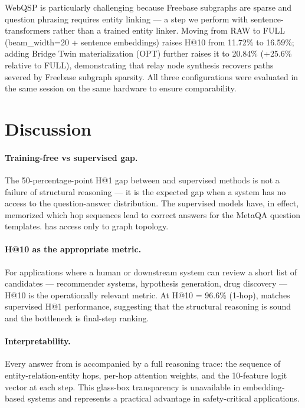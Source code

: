 \documentclass[10pt,twocolumn]{article}
\begin{document}
WebQSP is particularly challenging because Freebase subgraphs are sparse and
question phrasing requires entity linking — a step we perform with sentence-transformers
rather than a trained entity linker. Moving from RAW to FULL (beam\_width=20 +
sentence embeddings) raises H@10 from 11.72\% to 16.59\%; adding Bridge Twin
materialization (OPT) further raises it to 20.84\% (+25.6\% relative to FULL),
demonstrating that relay node synthesis recovers paths severed by Freebase subgraph
sparsity. All three configurations were evaluated in the same session on the same
hardware to ensure comparability.

\section{Discussion}
\label{sec:discussion}

\paragraph{Training-free vs supervised gap.}
The 50-percentage-point H@1 gap between \CEREBRUM{} and supervised methods is not a
failure of structural reasoning — it is the expected gap when a system has no access to
the question-answer distribution. The supervised models have, in effect, memorized which
hop sequences lead to correct answers for the MetaQA question templates. \CEREBRUM{} has
access only to graph topology.

\paragraph{H@10 as the appropriate metric.}
For applications where a human or downstream system can review a short list of candidates
— recommender systems, hypothesis generation, drug discovery — H@10 is the operationally
relevant metric. At H@10 = 96.6\% (1-hop), \CEREBRUM{} matches supervised H@1 performance,
suggesting that the structural reasoning is sound and the bottleneck is final-step ranking.

\paragraph{Interpretability.}
Every answer from \CEREBRUM{} is accompanied by a full reasoning trace: the sequence of
entity-relation-entity hops, per-hop attention weights, and the 10-feature \CSA{}
logit vector at each step. This glass-box transparency is unavailable in embedding-based
systems and represents a practical advantage in safety-critical applications.
\end{document}

